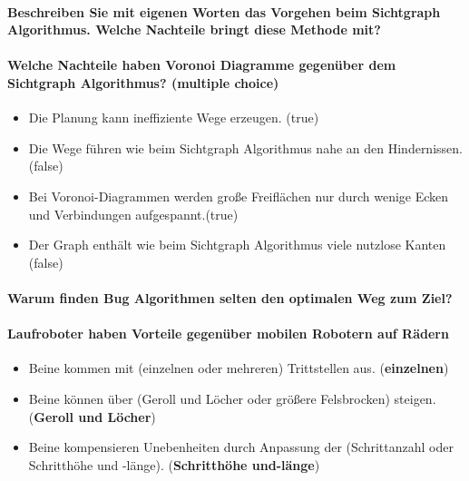 \paragraph{Beschreiben Sie mit eigenen Worten das Vorgehen beim Sichtgraph Algorithmus. Welche Nachteile bringt diese Methode mit?}
\paragraph{Welche Nachteile haben Voronoi Diagramme gegenüber dem Sichtgraph Algorithmus? (multiple choice)}
\begin{itemize}
	\item Die Planung kann ineffiziente Wege erzeugen. (true)
    \item Die Wege führen wie beim Sichtgraph Algorithmus nahe an den Hindernissen.(false)
    \item Bei Voronoi-Diagrammen werden große Freiflächen nur durch wenige Ecken und Verbindungen aufgespannt.(true)
    \item Der Graph enthält wie beim Sichtgraph Algorithmus viele nutzlose Kanten (false)
\end{itemize}
\paragraph{Warum finden Bug Algorithmen selten den optimalen Weg zum Ziel?}
\paragraph{Laufroboter haben Vorteile gegenüber mobilen Robotern auf Rädern}
\begin{itemize}
	\item Beine kommen mit (einzelnen oder mehreren) Trittstellen aus. (\textbf{einzelnen})
    \item Beine können über (Geroll und Löcher oder größere Felsbrocken) steigen. (\textbf{Geroll und Löcher})
    \item Beine kompensieren Unebenheiten durch Anpassung der (Schrittanzahl oder Schritthöhe und -länge). (\textbf{Schritthöhe und-länge})
\end{itemize}
